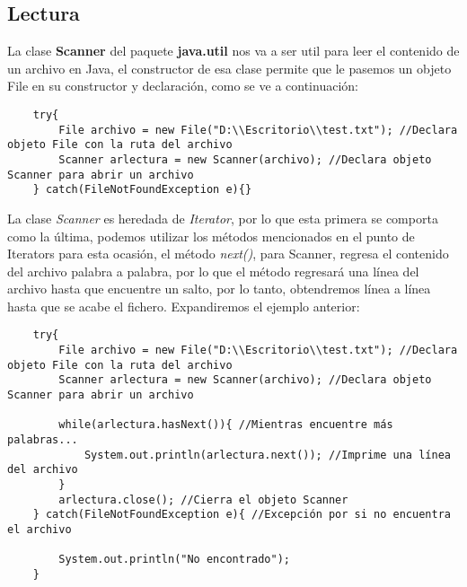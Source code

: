 \subsection{Lectura}
La clase \textbf{Scanner} del paquete \textbf{java.util} nos va a ser util para leer el contenido de un archivo en Java, el constructor de esa clase permite que le pasemos un objeto File en su constructor y declaración, como se ve a continuación:
\begin{lstlisting}
    try{
        File archivo = new File("D:\\Escritorio\\test.txt"); //Declara objeto File con la ruta del archivo
        Scanner arlectura = new Scanner(archivo); //Declara objeto Scanner para abrir un archivo
    } catch(FileNotFoundException e){}
\end{lstlisting}
La clase \textit{Scanner} es heredada de \textit{Iterator}, por lo que esta primera se comporta como la última, podemos utilizar los métodos mencionados en el punto de Iterators para esta ocasión, el método \textit{next()}, para Scanner, regresa el contenido del archivo palabra a palabra, por lo que el método regresará una línea del archivo hasta que encuentre un salto, por lo tanto, obtendremos línea a línea hasta que se acabe el fichero. Expandiremos el ejemplo anterior:
\begin{lstlisting}
    try{
        File archivo = new File("D:\\Escritorio\\test.txt"); //Declara objeto File con la ruta del archivo
        Scanner arlectura = new Scanner(archivo); //Declara objeto Scanner para abrir un archivo
        
        while(arlectura.hasNext()){ //Mientras encuentre más palabras...
            System.out.println(arlectura.next()); //Imprime una línea del archivo
        }
        arlectura.close(); //Cierra el objeto Scanner
    } catch(FileNotFoundException e){ //Excepción por si no encuentra el archivo
    
        System.out.println("No encontrado");
    }
\end{lstlisting}

